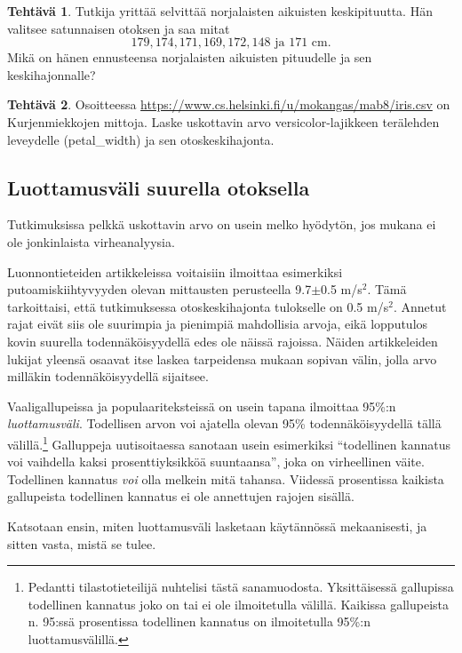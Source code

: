 \documentclass[12pt,leqno,a4paper,oneside]{amsart}
\theoremstyle{definition}
\newtheorem{exercise}{Tehtävä}
\theoremstyle{remark}
\numberwithin{equation}{section}
\begin{document}
\begin{exercise}
 Tutkija yrittää selvittää norjalaisten aikuisten keski\-pituutta. Hän valitsee satunnaisen otoksen ja saa mitat
 $$179, 174, 171, 169, 172, 148 \text{ ja } 171 \text{ cm.} $$
 Mikä on hänen ennusteensa norjalaisten aikuisten pituudelle ja sen keskihajonnalle?
\end{exercise}

\begin{exercise}
 Osoitteessa \url{https://www.cs.helsinki.fi/u/mokangas/mab8/iris.csv} on Kurjenmiekkojen mittoja. Laske uskottavin arvo versicolor-lajikkeen terälehden
 leveydelle (petal\_width) ja sen otoskeskihajonta.
\end{exercise}


\subsection{Luottamusväli suurella otoksella}

Tutkimuksissa pelkkä uskottavin arvo on usein melko hyödytön, jos mukana ei ole jonkinlaista virheanalyysia. 

Luonnontieteiden artikkeleissa voitaisiin ilmoittaa
esimerkiksi putoamis\-kiihtyvyyden olevan mittausten perusteella 9.7$\pm$0.5 m/s$^2$. Tämä tarkoittaisi, että tutkimuksessa otoskeskihajonta tulokselle
on 0.5 m/s$^2$. Annetut rajat eivät siis ole suurimpia ja pienimpiä mahdollisia arvoja, eikä lopputulos kovin suurella todennäköisyydellä edes ole 
näissä rajoissa. Näiden artikkeleiden lukijat yleensä osaavat itse laskea tarpeidensa mukaan sopivan välin, jolla arvo milläkin todennäköisyydellä
sijaitsee.

Vaaligallupeissa ja populaariteksteissä on usein tapana ilmoittaa 95\%:n \emph{luottamusväli}. Todellisen arvon voi ajatella olevan 95\% toden\-näköisyydel\-lä
tällä välillä.\footnote{Pedantti tilastotieteilijä nuhtelisi tästä sanamuodosta. Yksittäisessä gallupissa todellinen 
kannatus joko on tai ei ole ilmoitetulla välillä. Kaikissa gallupeista n. 95:ssä prosentissa todellinen kannatus on ilmoitetulla
95\%:n luottamusvälillä.} Galluppeja uutisoitaessa sanotaan usein esimerkiksi
``todellinen kannatus voi vaihdella kaksi prosenttiyksikköä suuntaansa'', joka on virheellinen väite. Todellinen kannatus \emph{voi} olla melkein mitä tahansa. 
Viidessä prosentissa kaikista gallupeista todellinen
kannatus ei ole annettujen rajojen sisällä.

Katsotaan ensin, miten luottamusväli lasketaan käytännössä mekaanisesti, ja sitten vasta, mistä se tulee.
\end{document}
